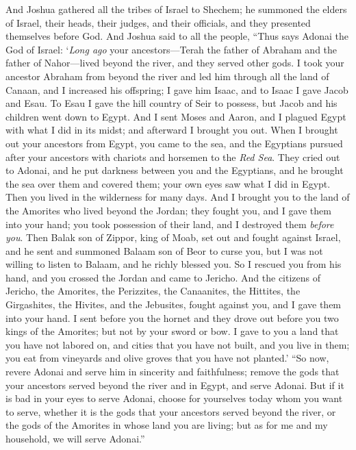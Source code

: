 \begin{biblechapter} %
 And Joshua gathered all the tribes of Israel to Shechem; he summoned the elders of Israel, their heads, their judges, and their officials, and they presented themselves before God.
\verse And Joshua said to all the people, “Thus says Adonai the God of Israel: ‘\textit{Long ago} your ancestors—Terah the father of Abraham and the father of Nahor—lived beyond the river, and they served other gods.
\verse I took your ancestor Abraham from beyond the river and led him through all the land of Canaan, and I increased his offspring; I gave him Isaac,
\verse and to Isaac I gave Jacob and Esau. To Esau I gave the hill country of Seir to possess, but Jacob and his children went down to Egypt.
\verse And I sent Moses and Aaron, and I plagued Egypt with what I did in its midst; and afterward I brought you out.
\verse When I brought out your ancestors from Egypt, you came to the sea, and the Egyptians pursued after your ancestors with chariots and horsemen to the \textit{Red Sea}.
\verse They cried out to Adonai, and he put darkness between you and the Egyptians, and he brought the sea over them and covered them; your own eyes saw what I did in Egypt. Then you lived in the wilderness for many days.
\verse And I brought you to the land of the Amorites who lived beyond the Jordan; they fought you, and I gave them into your hand; you took possession of their land, and I destroyed them \textit{before you}.
\verse Then Balak son of Zippor, king of Moab, set out and fought against Israel, and he sent and summoned Balaam son of Beor to curse you,
\verse but I was not willing to listen to Balaam, and he richly blessed you. So I rescued you from his hand,
\verse and you crossed the Jordan and came to Jericho. And the citizens of Jericho, the Amorites, the Perizzites, the Canaanites, the Hittites, the Girgashites, the Hivites, and the Jebusites, fought against you, and I gave them into your hand.
\verse I sent before you the hornet and they drove out before you two kings of the Amorites; but not by your sword or bow.
\verse I gave to you a land that you have not labored on, and cities that you have not built, and you live in them; you eat from vineyards and olive groves that you have not planted.’
 “So now, revere Adonai and serve him in sincerity and faithfulness; remove the gods that your ancestors served beyond the river and in Egypt, and serve Adonai.
\verse But if it is bad in your eyes to serve Adonai, choose for yourselves today whom you want to serve, whether it is the gods that your ancestors served beyond the river, or the gods of the Amorites in whose land you are living; but as for me and my household, we will serve Adonai.”

\end{biblechapter}
